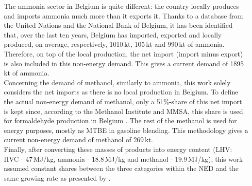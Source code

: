 The ammonia sector in Belgium is quite different: the country locally produces and imports ammonia much more than it exports it. Thanks to a database from the United Nations \cite{UN_statistics} and the National Bank of Belgium, it has been identified that, over the last ten years, Belgium has imported, exported and locally produced, on average, respectively, 1010\,kt, 105\,kt and 990\,kt of ammonia. Therefore, on top of the local production, the net import (\ie import minus export) is also included in this non-energy demand. This gives a current demand of 1895\,kt of ammonia.\\

Concerning the demand of methanol, similarly to ammonia, this work solely considers the net imports as there is no local production in Belgium. To define the actual non-energy demand of methanol, only a 51\%-share of this net import is kept since, according to the Methanol Institute and \gls{MMSA}, this share is used for formaldehyde production in Belgium \cite{MMSA51}. The rest of the methanol is used for energy purposes, mostly as \gls{MTBE} in gasoline blending. This methodology gives a current non-energy demand of methanol of 269\,kt.\\

Finally, after converting these masses of products into energy content (\ie LHV: \gls{HVC} - 47\,MJ/kg, ammonia - 18.8\,MJ/kg and methanol - 19.9\,MJ/kg), this work assumed constant shares between the three categories within the \gls{NED} and the same growing rate as presented by \citet{EuropeanCommission2016}.

